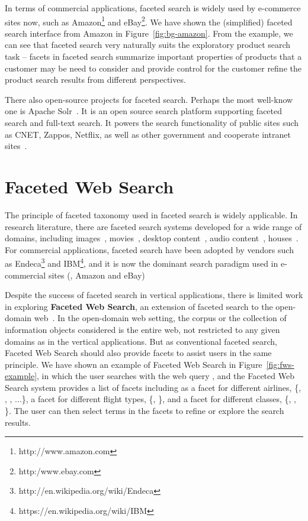 In terms of commercial applications, faceted search is widely used by e-commerce sites now, such as Amazon\footnote{http://www.amazon.com} and eBay\footnote{http:/www.ebay.com}. We have shown the (simplified) faceted search interface from Amazon in Figure~\ref{fig:bg-amazon}. From the example, we can see that faceted search very naturally suits the exploratory product search task -- facets in faceted search summarize important properties of products that a customer may be need to consider and provide control for the customer refine the product search results from different perspectives. 

There also open-source projects for faceted search. Perhaps the most well-know one is  Apache Solr~\cite{smiley2011apache}. It is an open source search platform supporting faceted search and full-text search. It powers the search functionality of public sites such as CNET, Zappos, Netflix, as well as other government and cooperate intranet sites~\cite{wei2013survey}.

\section{Faceted Web Search}
\label{sec:bg-fws}
The principle of faceted taxonomy used in faceted search is widely applicable. In research literature, there are faceted search systems developed for a wide range of domains, including images~\cite{yee2003faceted}, movies~\cite{koren2008personalized}, desktop content~\cite{cutrell2006fast}, audio content~\cite{diao2010faceted}, houses~\cite{shneiderman1994dynamic}. For commercial applications, faceted search have been adopted by vendors such as Endeca\footnote{http://en.wikipedia.org/wiki/Endeca} and IBM\footnote{https://en.wikipedia.org/wiki/IBM}, and it is now the dominant search paradigm used in e-commercial sites (\eg, Amazon and eBay)

Despite the success of faceted search in vertical applications, there is limited work in exploring \textbf{Faceted Web Search}, an extension of faceted search to the open-domain web~\cite{kong2014extending}. In the open-domain web setting, the corpus or the collection of information objects considered is the entire web, not restricted to any given domains as in the vertical applications. But as conventional faceted search, Faceted Web Search should also provide facets to assist users in the same principle. We have shown an example of Faceted Web Search in Figure~\ref{fig:fws-example}, in which the user searches with the web query , and the Faceted Web Search system provides a list of facets including  as a facet for different airlines, \{, , , ...\}, a facet for different flight types, \{, \}, and a facet for different classes, \{, , \}. The user 
can then select terms in the facets to refine or explore the search results.

